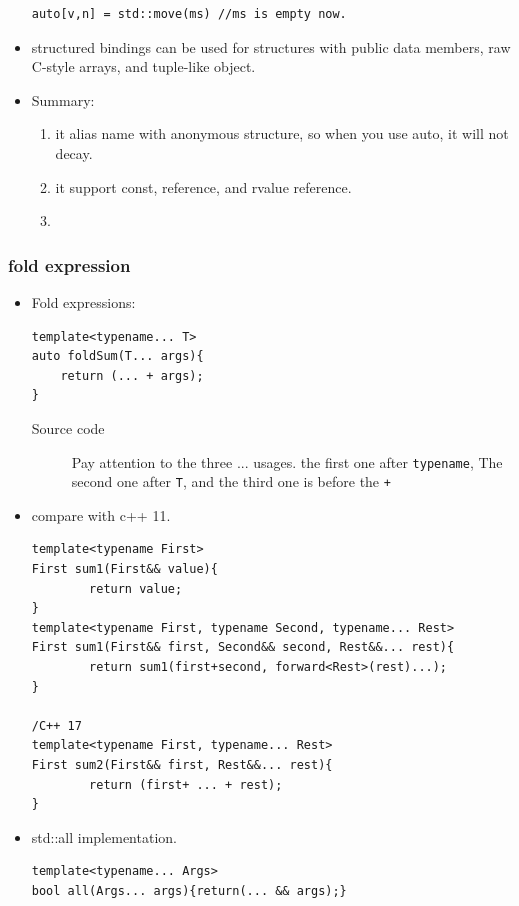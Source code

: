 \documentclass[a4paper,11pt,twoside]{book}
\begin{document}
\begin{itemize}
\begin{lstlisting}
auto[v,n] = std::move(ms) //ms is empty now.
\end{lstlisting}	

\item structured bindings can be used for structures with public data members, raw C-style arrays, and tuple-like object.

\item Summary:
\begin{enumerate}
	\item it alias name with anonymous structure, so when you use auto, it will not decay.
	\item it support const, reference, and rvalue reference.
	\item  
\end{enumerate}

\end{itemize}


\subsubsection{fold expression}

\begin{itemize}

\item Fold expressions:

\begin{lstlisting}
template<typename... T>
auto foldSum(T... args){
	return (... + args);
}
\end{lstlisting}
\begin{description}
	\item[Source code] Pay attention to the three ... usages. the first one after \texttt{typename}, The second one after \texttt{T}, and the third one is before the \texttt{+}
\end{description}	


\item compare with c++ 11.
\begin{lstlisting}
template<typename First>
First sum1(First&& value){
		return value;
}
template<typename First, typename Second, typename... Rest>
First sum1(First&& first, Second&& second, Rest&&... rest){
		return sum1(first+second, forward<Rest>(rest)...);
}

/C++ 17
template<typename First, typename... Rest>
First sum2(First&& first, Rest&&... rest){
		return (first+ ... + rest);
}
\end{lstlisting}
\item std::all implementation.
\begin{lstlisting}
template<typename... Args>
bool all(Args... args){return(... && args);}
\end{lstlisting}

\end{itemize}
\end{document}
